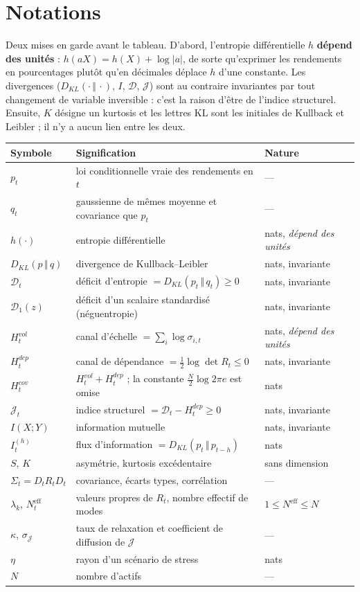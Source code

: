 \documentclass[11pt]{article}
\theoremstyle{definition}
\theoremstyle{remark}
\newcommand{\JJ}{\mathcal{J}}
\newcommand{\DD}{\mathcal{D}}
\newcommand{\Dun}{\mathcal{D}_1}
\newcommand{\KL}[2]{D_{KL}\!\left(#1\,\Vert\,#2\right)}
\begin{document}
\section*{Notations}

\noindent Deux mises en garde avant le tableau. D'abord, l'entropie
différentielle $h$ \textbf{dépend des unités} : $h(aX)=h(X)+\log|a|$, de sorte
qu'exprimer les rendements en pourcentages plutôt qu'en décimales déplace $h$
d'une constante. Les divergences ($\KL{\cdot}{\cdot}$, $I$, $\DD$, $\JJ$) sont au
contraire invariantes par tout changement de variable inversible : c'est la
raison d'être de l'indice structurel. Ensuite, $K$ désigne un kurtosis et les
lettres \og KL \fg{} sont les initiales de Kullback et Leibler ; il n'y a aucun
lien entre les deux.

\begin{center}
\small
\begin{tabular}{@{}lll@{}}
\toprule
Symbole & Signification & Nature \\
\midrule
$p_t$ & loi conditionnelle vraie des rendements en $t$ & --- \\
$q_t$ & gaussienne de mêmes moyenne et covariance que $p_t$ & --- \\
$h(\cdot)$ & entropie différentielle & nats, \emph{dépend des unités} \\
$\KL{p}{q}$ & divergence de Kullback--Leibler & nats, invariante \\
$\DD_t$ & déficit d'entropie $=\KL{p_t}{q_t}\ge0$ & nats, invariante \\
$\Dun(z)$ & déficit d'un scalaire standardisé (néguentropie) & nats, invariante \\
$H^{vol}_t$ & canal d'échelle $=\sum_i\log\sigma_{i,t}$ & nats, \emph{dépend des unités} \\
$H^{dep}_t$ & canal de dépendance $=\tfrac12\log\det R_t\le0$ & nats, invariante \\
$H^{cov}_t$ & $H^{vol}_t+H^{dep}_t$ ; la constante $\tfrac N2\log2\pi e$ est omise & nats \\
$\JJ_t$ & indice structurel $=\DD_t-H^{dep}_t\ge0$ & nats, invariante \\
$I(X;Y)$ & information mutuelle & nats, invariante \\
$I^{(h)}_t$ & flux d'information $=\KL{p_t}{p_{t-h}}$ & nats \\
$S$, $K$ & asymétrie, kurtosis excédentaire & sans dimension \\
$\Sigma_t=D_tR_tD_t$ & covariance, écarts types, corrélation & --- \\
$\lambda_k$, $N^{\text{eff}}_t$ & valeurs propres de $R_t$, nombre effectif de modes & $1\le N^{\text{eff}}\le N$ \\
$\kappa$, $\sigma_\JJ$ & taux de relaxation et coefficient de diffusion de $\JJ$ & --- \\
$\eta$ & rayon d'un scénario de stress & nats \\
$N$ & nombre d'actifs & --- \\
\bottomrule
\end{tabular}
\end{center}
\end{document}
